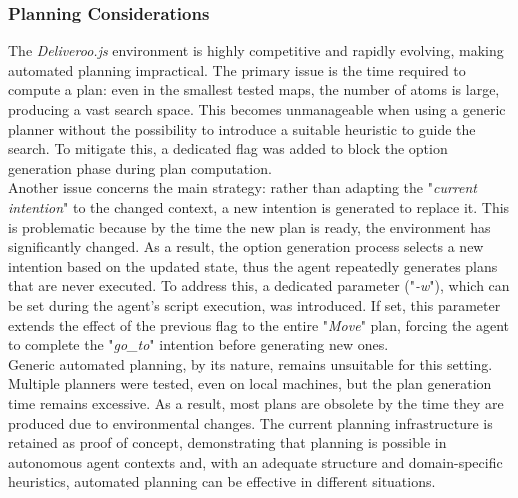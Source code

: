         \subsubsection{Planning Considerations}
            The \textit{Deliveroo.js} environment is highly competitive and rapidly evolving, making automated planning impractical. The primary issue is the time required to compute a plan: even in the smallest tested maps, the number of atoms is large, producing a vast search space. This becomes unmanageable when using a generic planner without the possibility to introduce a suitable heuristic to guide the search. To mitigate this, a dedicated flag was added to block the option generation phase during plan computation.
            \medskip\\
            Another issue concerns the main strategy: rather than adapting the "\textit{current intention}" to the changed context, a new intention is generated to replace it. This is problematic because by the time the new plan is ready, the environment has significantly changed. As a result, the option generation process selects a new intention based on the updated state, thus the agent repeatedly generates plans that are never executed. To address this, a dedicated parameter ("\textit{-w}"), which can be set during the agent's script execution, was introduced. If set, this parameter extends the effect of the previous flag to the entire "\textit{Move}" plan, forcing the agent to complete the "\textit{go\_to}" intention before generating new ones.
            \medskip\\
            Generic automated planning, by its nature, remains unsuitable for this setting. Multiple planners were tested, even on local machines, but the plan generation time remains excessive. As a result, most plans are obsolete by the time they are produced due to environmental changes. The current planning infrastructure is retained as proof of concept, demonstrating that planning is possible in autonomous agent contexts and, with an adequate structure and domain-specific heuristics, automated planning can be effective in different situations.
